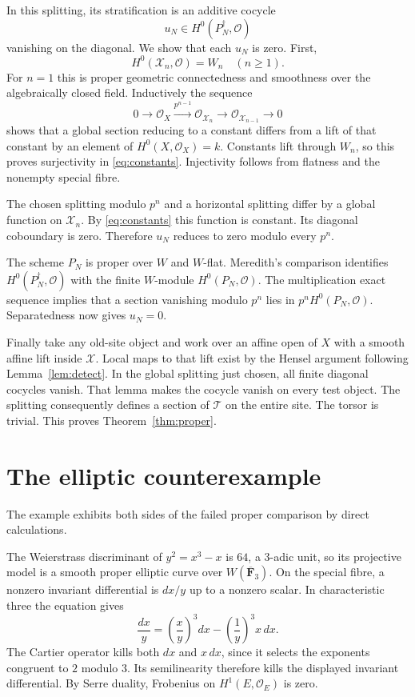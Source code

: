 \documentclass[11pt]{article}
\newcommand{\OO}{\mathcal O}\newcommand{\CC}{\mathcal C}
\theoremstyle{definition}\newtheorem{definition}[theorem]{Definition}
\theoremstyle{remark}\newtheorem{remark}[theorem]{Remark}
\begin{document}
In this splitting, its stratification is an additive cocycle
\[
 u_N\in H^0(P_N^\dagger,\OO)
\]
vanishing on the diagonal. We show that each $u_N$ is zero. First,
\begin{equation}\label{eq:constants}
 H^0(\mathcal X_n,\OO)=W_n\quad(n\geq1).
\end{equation}
For $n=1$ this is proper geometric connectedness and smoothness over the algebraically closed field. Inductively the sequence
\[
 0\longrightarrow\OO_X\xrightarrow{p^{n-1}}
 \OO_{\mathcal X_n}\longrightarrow\OO_{\mathcal X_{n-1}}
 \longrightarrow0
\]
shows that a global section reducing to a constant differs from a lift of that constant by an element of $H^0(X,\OO_X)=k$. Constants lift through $W_n$, so this proves surjectivity in \eqref{eq:constants}. Injectivity follows from flatness and the nonempty special fibre.

The chosen splitting modulo $p^n$ and a horizontal splitting differ by a global function on $\mathcal X_n$. By \eqref{eq:constants} this function is constant. Its diagonal coboundary is zero. Therefore $u_N$ reduces to zero modulo every $p^n$.

The scheme $P_N$ is proper over $W$ and $W$-flat. Meredith's comparison identifies $H^0(P_N^\dagger,\OO)$ with the finite $W$-module $H^0(P_N,\OO)$. The multiplication exact sequence implies that a section vanishing modulo $p^n$ lies in $p^nH^0(P_N,\OO)$. Separatedness now gives $u_N=0$.

Finally take any old-site object and work over an affine open of $X$ with a smooth affine lift inside $\mathcal X$. Local maps to that lift exist by the Hensel argument following Lemma~\ref{lem:detect}. In the global splitting just chosen, all finite diagonal cocycles vanish. That lemma makes the cocycle vanish on every test object. The splitting consequently defines a section of $\mathcal T$ on the entire site. The torsor is trivial. This proves Theorem~\ref{thm:proper}.

\section{The elliptic counterexample}

The example exhibits both sides of the failed proper comparison by direct calculations.

The Weierstrass discriminant of $y^2=x^3-x$ is $64$, a $3$-adic unit, so its projective model is a smooth proper elliptic curve over $W(\overline{\mathbf F}_3)$. On the special fibre, a nonzero invariant differential is $dx/y$ up to a nonzero scalar. In characteristic three the equation gives
\[
 \frac{dx}{y}
 =\left(\frac{x}{y}\right)^3dx
   -\left(\frac1y\right)^3x\,dx.
\]
The Cartier operator kills both $dx$ and $x\,dx$, since it selects the exponents congruent to $2$ modulo $3$. Its semilinearity therefore kills the displayed invariant differential. By Serre duality, Frobenius on $H^1(E,\OO_E)$ is zero.
\end{document}

